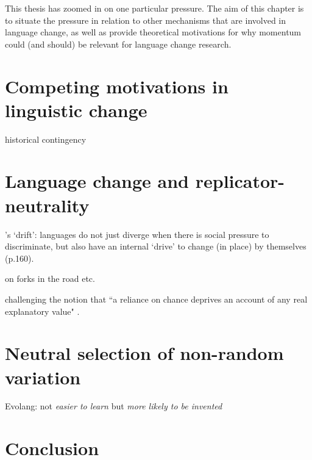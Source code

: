 This thesis has zoomed in on one particular pressure. The aim of this chapter is to situate the pressure in relation to other mechanisms that are involved in language change, as well as provide theoretical motivations for why momentum could (and should) be relevant for language change research.

\section{Competing motivations in linguistic change}




historical contingency~\citep[p.503]{Labov2001} %

\section{Language change and replicator-neutrality}

\citet{Sapir1921}'s `drift': languages do not just diverge when there is social pressure to discriminate, but also have an internal `drive' to change (in place) by themselves (p.160).

\citep[ch.7-12]{Labov2010} on forks in the road etc.

challenging the notion that ``a reliance on chance deprives an account of any real explanatory value" \citep[p.44]{Joseph2013}.

\section{Neutral selection of non-random variation}

Evolang: not \emph{easier to learn} but \emph{more likely to be invented}





\section{Conclusion}

